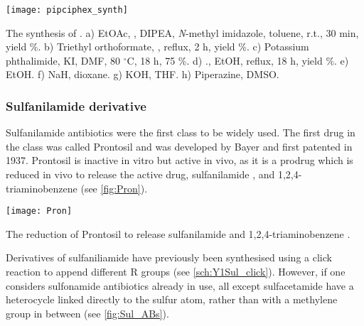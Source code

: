 \begin{scheme}[H]
	\begin{center}
		\texttt{[image: pipciphex\_synth]}
		\caption{The synthesis of .
		a) EtOAc, , DIPEA, \textit{N}-methyl imidazole, toluene, r.t., 30 min, yield \%.
		b) Triethyl orthoformate, , reflux, 2 h, yield \%.
		c) Potassium phthalimide, KI, DMF, 80 $^{\circ}$C, 18 h, 75 \%.
		d) ., EtOH, reflux, 18 h, yield \%.
		e) EtOH.
		f) NaH, dioxane.
		g) KOH, THF.
		h) Piperazine, DMSO.
		\label{sch:pipciphex_synth}}
	\end{center}
\end{scheme}

\subsubsection{Sulfanilamide derivative}

Sulfanilamide antibiotics were the first class to be widely used\cite{Otten1986,Wainwright2011}. The first drug in the class was called Prontosil  and was developed by Bayer and first patented in 1937. Prontosil  is inactive in vitro but active in vivo, as it is a prodrug which is reduced in vivo to release the active drug, sulfanilamide , and 1,2,4-triaminobenzene  (see \ref{fig:Pron}).



\begin{scheme}[H]
	\begin{center}
		\texttt{[image: Pron]}
		\caption{The reduction of Prontosil  to release sulfanilamide  and 1,2,4-triaminobenzene .
		\label{fig:Pron}}
	\end{center}
\end{scheme}

Derivatives of sulfaniliamide  have previously been synthesised using a click reaction to append different R groups\cite{Wang2010} (see \ref{sch:Y1Sul_click}). However, if one considers sulfonamide antibiotics already in use, all except sulfacetamide have a heterocycle linked directly to the sulfur atom, rather than with a methylene group in between (see \ref{fig:Sul_ABs}). 

